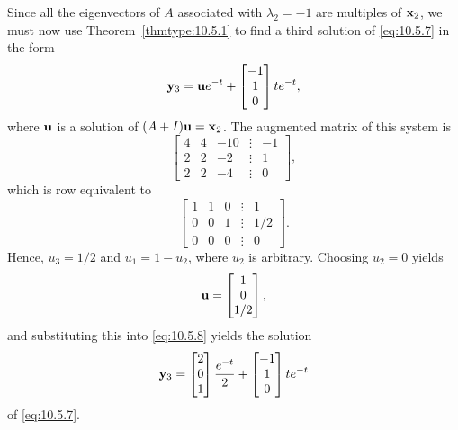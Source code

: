 \documentclass{ximera}
\begin{document}
\begin{example}
\begin{explanation}
Since all the eigenvectors of $A$ associated with $\lambda_2=-1$ are
multiples of ${\bf x}_2$, we must now use Theorem~\ref{thmtype:10.5.1} to
find a third solution of \eqref{eq:10.5.7} in the form
\begin{equation}\label{eq:10.5.8}
{\bf y}_3={\bf u}e^{-t}+\begin{bmatrix}-1\\1\\0\end{bmatrix}te^{-t},
\end{equation}
where ${\bf u}$ is a solution of $(A+I){\bf u=x}_2$.
The  augmented matrix  of this system is
$$
\begin{bmatrix} 4 & 4 & -10 &\vdots & -1\\ 2 & 2 & -2 &
\vdots & 1\\ 2 & 2 & -4 &\vdots & 0\end{bmatrix},
$$
which is  row equivalent to
$$
\begin{bmatrix} 1 & 1 & 0 &\vdots& 1\\ 0 & 0 & 1
&\vdots& 1/2
\\ 0 & 0 & 0 &\vdots&0\end{bmatrix}.
$$
Hence, $u_3=1/2$ and $u_1 =1-u_2$, where $u_2$  is
arbitrary. Choosing $u_2=0$ yields
$$
{\bf u} =\begin{bmatrix}1\\0\\1/2\end{bmatrix},
$$
and substituting this into  \eqref{eq:10.5.8}
yields the solution
$$
{\bf y}_3=\begin{bmatrix}2\\0\\1\end{bmatrix}\frac{e^{-t}}{2}+\begin{bmatrix}-1\\1\\0\end{bmatrix}te^{-t}
$$
of  \eqref{eq:10.5.7}.


\end{explanation}
\end{example}
\end{document}
